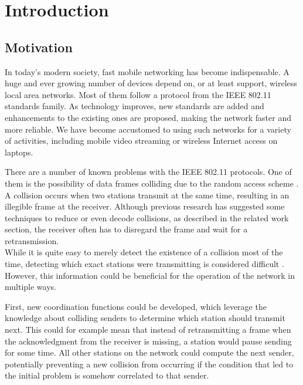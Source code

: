 
\chapter{Introduction}\label{ch:introduction}
\glsresetall %
 



\section{Motivation}

In today's modern society, fast mobile networking has become indispensable. A huge and ever growing number of devices depend on, or at least support, wireless local area networks. Most of them follow a protocol from the \gls{IEEE} 802.11 standards family. As technology improves, new standards are added and enhancements to the existing ones are proposed, making the network faster and more reliable. We have become accustomed to using such networks for a variety of activities, including mobile video streaming or wireless Internet access on laptops.

There are a number of known problems with the \gls{IEEE} 802.11 protocols. One of them is the possibility of data frames colliding due to the random access scheme \cite{bianchi2000}. A collision occurs when two stations transmit at the same time, resulting in an illegible frame at the receiver. Although previous research has suggested some techniques to reduce or even decode collisions, as described in the related work section, the receiver often has to disregard the frame and wait for a retransmission.\\

While it is quite easy to merely detect the existence of a collision most of the time, detecting which exact stations were transmitting is considered difficult \cite{choi2013, keene2010}. However, this information could be beneficial for the operation of the network in multiple ways.

First, new coordination functions could be developed, which leverage the knowledge about colliding senders to determine which station should transmit next. This could for example mean that instead of retransmitting a frame when the acknowledgment from the receiver is missing, a station would pause sending for some time. All other stations on the network could compute the next sender, potentially preventing a new collision from occurring if the condition that led to the initial problem is somehow correlated to that sender.

